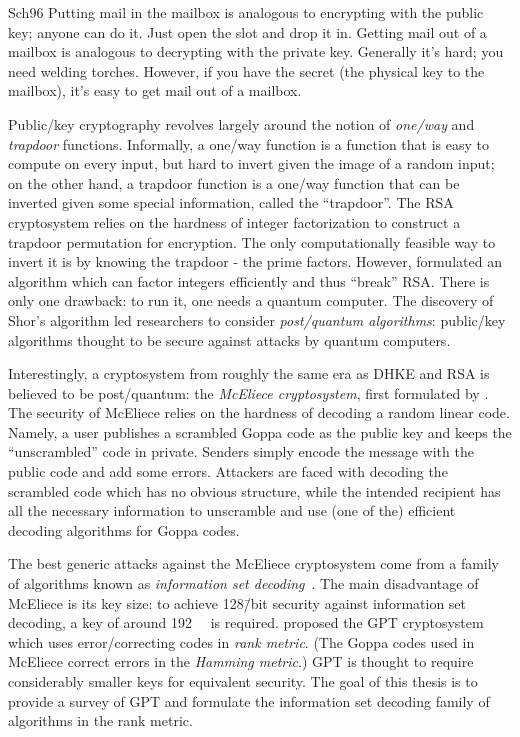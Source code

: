 \documentclass[version=last, paper=A4, parskip=half, oneside]{scrbook}
\theoremstyle{plain}
\theoremstyle{definition}
\theoremstyle{remark}
\begin{document}
\begin{displaycquote}{Sch96}
  Putting mail in the mailbox is analogous to encrypting with the public key;
  anyone can do it.  Just open the slot and drop it in.  Getting mail out of a
  mailbox is analogous to decrypting with the private key.  Generally it's hard;
  you need welding torches.  However, if you have the secret (the physical key
  to the mailbox), it's easy to get mail out of a mailbox.
\end{displaycquote}

Public\-/key cryptography revolves largely around the notion of \emph{one\-/way}
and \emph{trapdoor} functions.  Informally, a one\-/way function is a function
that is easy to compute on every input, but hard to invert given the image of a
random input; on the other hand, a trapdoor function is a one\-/way function
that can be inverted given some special information, called the
\enquote{trapdoor}.  The RSA cryptosystem relies on the hardness of integer
factorization to construct a trapdoor permutation for encryption.  The only
computationally feasible way to invert it is by knowing the trapdoor \--{} the
prime factors.  However, \textcite{Sho97} formulated an algorithm which can
factor integers efficiently and thus \enquote{break} RSA\@.  There is only one
drawback: to run it, one needs a quantum computer.  The discovery of Shor's
algorithm led researchers to consider \emph{post\-/quantum algorithms}:
public\-/key algorithms thought to be secure against attacks by quantum
computers.

Interestingly, a cryptosystem from roughly the same era as DHKE and RSA is
believed to be post\-/quantum: the \emph{McEliece cryptosystem}, first
formulated by \textcite{Eli78}.  The security of McEliece relies on the hardness
of decoding a random linear code.  Namely, a user publishes a scrambled Goppa
code as the public key and keeps the \enquote{unscrambled} code in private.
Senders simply encode the message with the public code and add some errors.
Attackers are faced with decoding the scrambled code which has no obvious
structure, while the intended recipient has all the necessary information to
unscramble and use (one of the) efficient decoding algorithms for Goppa codes.

The best generic attacks against the McEliece cryptosystem come from a family
of algorithms known as \emph{information set decoding}~\cite{B+12}.  The main
disadvantage of McEliece is its key size: to achieve \num{128}\=/bit security
against information set decoding, a key of around \SI{192}{\kilo\byte} is
required.  \Textcite{GPT91} proposed the GPT cryptosystem which uses
error\-/correcting codes in \emph{rank metric}.  (The Goppa codes used in
McEliece correct errors in the \emph{Hamming metric}.)  GPT is thought to
require considerably smaller keys for equivalent security.  The goal of this
thesis is to provide a survey of GPT and formulate the information set decoding
family of algorithms in the rank metric.
\end{document}
